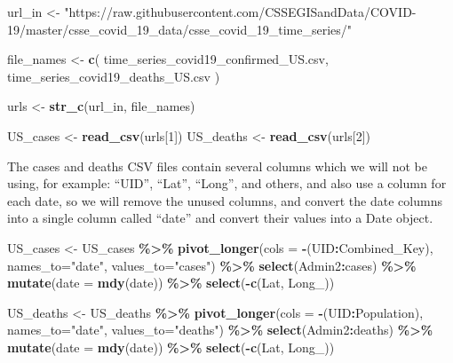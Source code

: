 \documentclass[
]{article}
\newenvironment{Shaded}{\begin{snugshade}}{\end{snugshade}}
\newcommand{\AttributeTok}[1]{\textcolor[rgb]{0.13,0.29,0.53}{#1}}
\newcommand{\DecValTok}[1]{\textcolor[rgb]{0.00,0.00,0.81}{#1}}
\newcommand{\FunctionTok}[1]{\textcolor[rgb]{0.13,0.29,0.53}{\textbf{#1}}}
\newcommand{\NormalTok}[1]{#1}
\newcommand{\OtherTok}[1]{\textcolor[rgb]{0.56,0.35,0.01}{#1}}
\newcommand{\SpecialCharTok}[1]{\textcolor[rgb]{0.81,0.36,0.00}{\textbf{#1}}}
\newcommand{\StringTok}[1]{\textcolor[rgb]{0.31,0.60,0.02}{#1}}
\begin{document}
\begin{Shaded}
\begin{Highlighting}[]
\NormalTok{url\_in }\OtherTok{\textless{}{-}} \StringTok{"https://raw.githubusercontent.com/CSSEGISandData/COVID{-}19/master/csse\_covid\_19\_data/csse\_covid\_19\_time\_series/"}

\NormalTok{file\_names }\OtherTok{\textless{}{-}} \FunctionTok{c}\NormalTok{(}
  \StringTok{\textquotesingle{}time\_series\_covid19\_confirmed\_US.csv\textquotesingle{}}\NormalTok{,}
  \StringTok{\textquotesingle{}time\_series\_covid19\_deaths\_US.csv\textquotesingle{}}
\NormalTok{)}

\NormalTok{urls }\OtherTok{\textless{}{-}} \FunctionTok{str\_c}\NormalTok{(url\_in, file\_names)}

\NormalTok{US\_cases }\OtherTok{\textless{}{-}} \FunctionTok{read\_csv}\NormalTok{(urls[}\DecValTok{1}\NormalTok{])}
\NormalTok{US\_deaths }\OtherTok{\textless{}{-}} \FunctionTok{read\_csv}\NormalTok{(urls[}\DecValTok{2}\NormalTok{])}
\end{Highlighting}
\end{Shaded}

The cases and deaths CSV files contain several columns which we will not
be using, for example: ``UID'', ``Lat'', ``Long'', and others, and also
use a column for each date, so we will remove the unused columns, and
convert the date columns into a single column called ``date'' and
convert their values into a Date object.

\begin{Shaded}
\begin{Highlighting}[]
\NormalTok{US\_cases }\OtherTok{\textless{}{-}}\NormalTok{ US\_cases }\SpecialCharTok{\%\textgreater{}\%} 
  \FunctionTok{pivot\_longer}\NormalTok{(}\AttributeTok{cols =} \SpecialCharTok{{-}}\NormalTok{(UID}\SpecialCharTok{:}\NormalTok{Combined\_Key), }\AttributeTok{names\_to=}\StringTok{"date"}\NormalTok{, }\AttributeTok{values\_to=}\StringTok{"cases"}\NormalTok{) }\SpecialCharTok{\%\textgreater{}\%}
  \FunctionTok{select}\NormalTok{(Admin2}\SpecialCharTok{:}\NormalTok{cases) }\SpecialCharTok{\%\textgreater{}\%}
  \FunctionTok{mutate}\NormalTok{(}\AttributeTok{date =} \FunctionTok{mdy}\NormalTok{(date)) }\SpecialCharTok{\%\textgreater{}\%}
  \FunctionTok{select}\NormalTok{(}\SpecialCharTok{{-}}\FunctionTok{c}\NormalTok{(Lat, Long\_))}

\NormalTok{US\_deaths }\OtherTok{\textless{}{-}}\NormalTok{ US\_deaths }\SpecialCharTok{\%\textgreater{}\%} 
  \FunctionTok{pivot\_longer}\NormalTok{(}\AttributeTok{cols =} \SpecialCharTok{{-}}\NormalTok{(UID}\SpecialCharTok{:}\NormalTok{Population), }\AttributeTok{names\_to=}\StringTok{"date"}\NormalTok{, }\AttributeTok{values\_to=}\StringTok{"deaths"}\NormalTok{) }\SpecialCharTok{\%\textgreater{}\%}
  \FunctionTok{select}\NormalTok{(Admin2}\SpecialCharTok{:}\NormalTok{deaths) }\SpecialCharTok{\%\textgreater{}\%}
  \FunctionTok{mutate}\NormalTok{(}\AttributeTok{date =} \FunctionTok{mdy}\NormalTok{(date)) }\SpecialCharTok{\%\textgreater{}\%}
  \FunctionTok{select}\NormalTok{(}\SpecialCharTok{{-}}\FunctionTok{c}\NormalTok{(Lat, Long\_))}
\end{Highlighting}
\end{Shaded}
\end{document}
